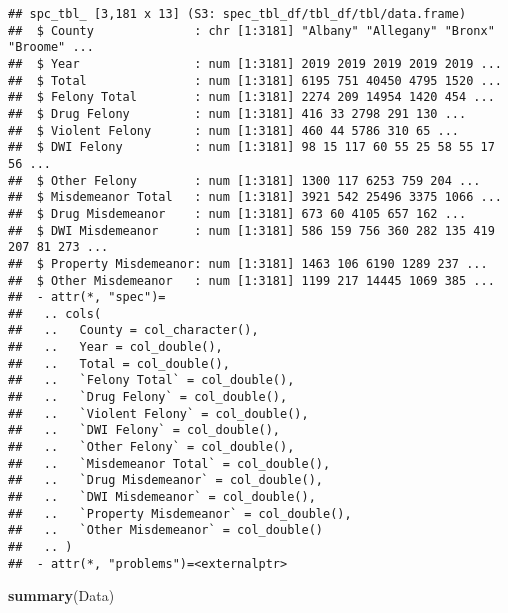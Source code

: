 \documentclass[
]{article}
\newenvironment{Shaded}{\begin{snugshade}}{\end{snugshade}}
\newcommand{\FunctionTok}[1]{\textcolor[rgb]{0.13,0.29,0.53}{\textbf{#1}}}
\newcommand{\NormalTok}[1]{#1}
\begin{document}
\begin{verbatim}
## spc_tbl_ [3,181 x 13] (S3: spec_tbl_df/tbl_df/tbl/data.frame)
##  $ County              : chr [1:3181] "Albany" "Allegany" "Bronx" "Broome" ...
##  $ Year                : num [1:3181] 2019 2019 2019 2019 2019 ...
##  $ Total               : num [1:3181] 6195 751 40450 4795 1520 ...
##  $ Felony Total        : num [1:3181] 2274 209 14954 1420 454 ...
##  $ Drug Felony         : num [1:3181] 416 33 2798 291 130 ...
##  $ Violent Felony      : num [1:3181] 460 44 5786 310 65 ...
##  $ DWI Felony          : num [1:3181] 98 15 117 60 55 25 58 55 17 56 ...
##  $ Other Felony        : num [1:3181] 1300 117 6253 759 204 ...
##  $ Misdemeanor Total   : num [1:3181] 3921 542 25496 3375 1066 ...
##  $ Drug Misdemeanor    : num [1:3181] 673 60 4105 657 162 ...
##  $ DWI Misdemeanor     : num [1:3181] 586 159 756 360 282 135 419 207 81 273 ...
##  $ Property Misdemeanor: num [1:3181] 1463 106 6190 1289 237 ...
##  $ Other Misdemeanor   : num [1:3181] 1199 217 14445 1069 385 ...
##  - attr(*, "spec")=
##   .. cols(
##   ..   County = col_character(),
##   ..   Year = col_double(),
##   ..   Total = col_double(),
##   ..   `Felony Total` = col_double(),
##   ..   `Drug Felony` = col_double(),
##   ..   `Violent Felony` = col_double(),
##   ..   `DWI Felony` = col_double(),
##   ..   `Other Felony` = col_double(),
##   ..   `Misdemeanor Total` = col_double(),
##   ..   `Drug Misdemeanor` = col_double(),
##   ..   `DWI Misdemeanor` = col_double(),
##   ..   `Property Misdemeanor` = col_double(),
##   ..   `Other Misdemeanor` = col_double()
##   .. )
##  - attr(*, "problems")=<externalptr>
\end{verbatim}

\begin{Shaded}
\begin{Highlighting}[]
\FunctionTok{summary}\NormalTok{(Data)}
\end{Highlighting}
\end{Shaded}
\end{document}
